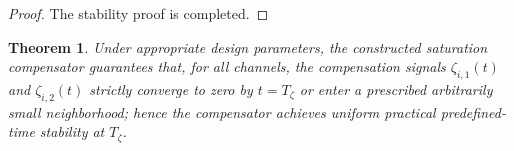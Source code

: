 \documentclass[pdflatex,sn-mathphys-num]{sn-jnl}%
\theoremstyle{thmstyleone}%
\newtheorem{theorem}{Theorem}%
\theoremstyle{thmstyletwo}%
\newtheorem{remark}{Remark}%
\theoremstyle{thmstylethree}%
\begin{document}
\begin{proof}
The stability proof is completed.
\end{proof}




\begin{theorem}
	Under appropriate design parameters, the constructed saturation compensator guarantees that, for all channels, the compensation signals $\zeta_{i,1}(t)$ and $\zeta_{i,2}(t)$ strictly converge to zero by $t=T_{\zeta}$ or enter a prescribed arbitrarily small neighborhood; hence the compensator achieves \emph{uniform practical predefined-time stability} at $T_{\zeta}$.
\end{theorem}
\end{document}
